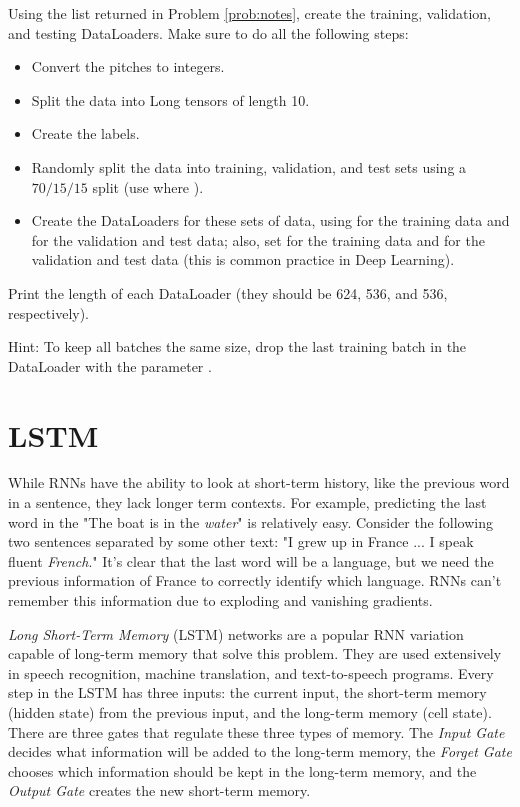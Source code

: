 \begin{problem}
Using the list returned in Problem \ref{prob:notes}, create the training, validation, and testing DataLoaders.
Make sure to do all the following steps:

\begin{itemize}
\item Convert the pitches to integers.
\item Split the data into Long tensors of length 10.
\item Create the labels.
\item Randomly split the data into training, validation, and test sets using a $70/15/15$ split (use  where ).
\item Create the DataLoaders for these sets of data, using  for the training data and  for the validation and test data; also, set  for the training data and  for the validation and test data (this is common practice in Deep Learning).
\end{itemize} 

\noindent Print the length of each DataLoader (they should be 624, 536, and 536, respectively).

\noindent Hint: To keep all batches the same size, drop the last training batch in the DataLoader with the parameter .
\label{prob:prob2}
\end{problem}


\section*{LSTM}

While RNNs have the ability to look at short-term history, like the previous word in a sentence, they lack longer term contexts.
For example, predicting the last word in the "The boat is in the \emph{water}" is relatively easy.
Consider the following two sentences separated by some other text: "I grew up in France ... I speak fluent \emph{French}."
It's clear that the last word will be a language, but we need the previous information of France to correctly identify which language.
RNNs can't remember this information due to exploding and vanishing gradients.

\emph{Long Short-Term Memory} (LSTM) networks are a popular RNN variation capable of long-term memory that solve this problem. 
They are used extensively in speech recognition, machine translation, and text-to-speech programs.
Every step in the LSTM has three inputs: the current input, the short-term memory (hidden state) from the previous input, and the long-term memory (cell state).
There are three gates that regulate these three types of memory.
The \emph{Input Gate} decides what information will be added to the long-term memory, the \emph{Forget Gate} chooses which information should be kept in the long-term memory, and the \emph{Output Gate} creates the new short-term memory.


